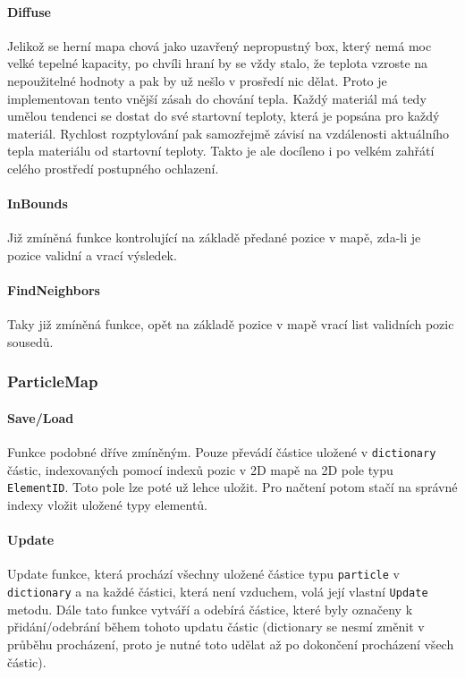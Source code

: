 \documentclass[a4paper, 12pt]{article}
\begin{document}
\paragraph{Diffuse}
Jelikož se herní mapa chová jako uzavřený nepropustný box, který nemá moc velké tepelné
kapacity, po chvíli hraní by se vždy stalo, že teplota vzroste na nepoužitelné
hodnoty a pak by už nešlo v prosředí nic dělat. Proto je implementovan tento
vnější zásah do chování tepla. Každý materiál má tedy umělou tendenci se dostat
do své startovní teploty, která je popsána pro každý materiál. Rychlost
rozptylování pak samozřejmě závisí na vzdálenosti aktuálního tepla materiálu od
startovní teploty. Takto je ale docíleno i po velkém zahřátí celého prostředí
postupného ochlazení.

\paragraph{InBounds}
Již zmíněná funkce kontrolující na základě předané pozice v mapě, zda-li je
pozice validní a vrací výsledek.

\paragraph{FindNeighbors}
Taky již zmíněná funkce, opět na základě pozice v mapě vrací list validních pozic
sousedů.

\subsubsection{ParticleMap}
\paragraph{Save/Load}
Funkce podobné dříve zmíněným. Pouze převádí částice uložené v
\texttt{dictionary} částic, indexovaných pomocí indexů pozic v 2D mapě na 2D
pole typu \texttt{ElementID}. Toto pole lze poté už lehce uložit. Pro načtení
potom stačí na správné indexy vložit uložené typy elementů.

\paragraph{Update}
Update funkce, která prochází všechny uložené částice typu \texttt{particle} v 
\texttt{dictionary} a na každé částici, která není vzduchem, volá její vlastní
\texttt{Update} metodu. Dále tato funkce vytváří a odebírá částice, které byly
označeny k přidání/odebrání během tohoto updatu částic (dictionary se nesmí
změnit v průběhu procházení, proto je nutné toto udělat až po dokončení
procházení všech částic).
\end{document}
